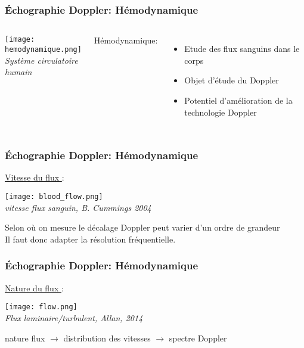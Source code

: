 \documentclass{beamer}
\begin{document}
\begin{frame}
\frametitle{\'Echographie Doppler: Hémodynamique}
\begin{columns}
\column{70mm}
\begin{center}
\texttt{[image: hemodynamique.png]}\\
\textit{\footnotesize Système circulatoire humain}
\end{center}
\column{50mm}
Hémodynamique:
\vspace{0.3cm}
\begin{itemize}
\item Etude des flux sanguins dans le corps 
\vspace{0.3cm}
\item Objet d'étude du Doppler
\vspace{0.3cm}
\item Potentiel d'amélioration de la technologie Doppler
\vspace{0.3cm}
\end{itemize}
\end{columns}
\end{frame}

\begin{frame}
\frametitle{\'Echographie Doppler: Hémodynamique}
\underline{Vitesse du flux }: 
\begin{center}
\texttt{[image: blood\_flow.png]}\\
\textit{\footnotesize vitesse flux sanguin, B. Cummings 2004}
\end{center}

Selon où on mesure le décalage Doppler peut varier d'un ordre de grandeur\\

\vspace{0.3cm}
Il faut donc adapter la résolution fréquentielle.

\end{frame}

\begin{frame}
\frametitle{\'Echographie Doppler: Hémodynamique}
\underline{Nature du flux }: 
\begin{center}
\texttt{[image: flow.png]}\\
\textit{\footnotesize Flux laminaire/turbulent, Allan, 2014}
\end{center}
\vspace{0.3cm}
nature flux $\rightarrow$ distribution des vitesses $\rightarrow$ spectre Doppler

\end{frame}
\end{document}
